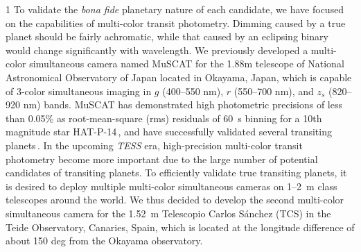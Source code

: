 \documentclass[a4paper,12pt]{spieman}  %
\begin{document}
\begin{spacing}{1}
To validate the {\it bona fide} planetary nature of each candidate,
we have focused on the capabilities of multi-color transit photometry.
Dimming caused by a true planet should be fairly achromatic,
while that caused by an eclipsing binary would change significantly with wavelength.
We previously developed a multi-color simultaneous camera
named MuSCAT\cite{2015JATIS...1d5001N}
for the 1.88m telescope of National Astronomical Observatory of Japan located in Okayama, Japan,
which is capable of 3-color simultaneous imaging in $g$ (400--550 nm),
$r$ (550--700 nm), and $z_s$ (820--920 nm) bands.
MuSCAT has demonstrated high photometric precisions of less
than 0.05\% as root-mean-square (rms) residuals of 60~s binning
for a 10th magnitude star HAT-P-14\cite{2016ApJ...819...27F}\,\!,
and have successfully validated several transiting
planets\cite{2017PASJ...69...29N,2017Natur.546..514G,2018AJ....155..127H}\,\!.
In the upcoming {\it TESS} era, high-precision multi-color transit photometry
become more important due to the large number of potential candidates of
transiting planets.
To efficiently validate true transiting planets, it is desired to deploy multiple
multi-color simultaneous cameras on 1--2~m class telescopes around the world.
We thus decided to develop the second multi-color simultaneous camera
for the 1.52~m  Telescopio Carlos S\'anchez (TCS) in the Teide Observatory, Canaries, Spain,
which is located at the longitude difference of about 150 deg from
the Okayama observatory.


\end{spacing}
\end{document}
